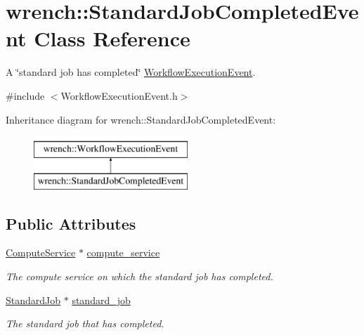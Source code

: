 \hypertarget{classwrench_1_1_standard_job_completed_event}{}\section{wrench\+:\+:Standard\+Job\+Completed\+Event Class Reference}
\label{classwrench_1_1_standard_job_completed_event}


A \char`\"{}standard job has completed\char`\"{} \hyperlink{classwrench_1_1_workflow_execution_event}{Workflow\+Execution\+Event}.  




{\ttfamily \#include $<$Workflow\+Execution\+Event.\+h$>$}

Inheritance diagram for wrench\+:\+:Standard\+Job\+Completed\+Event\+:\begin{figure}[H]
\begin{center}
\leavevmode
\includegraphics[height=2.000000cm]{classwrench_1_1_standard_job_completed_event}
\end{center}
\end{figure}
\subsection*{Public Attributes}
\begin{DoxyCompactItemize}
\item 
\mbox{\label{classwrench_1_1_standard_job_completed_event_a669562afa93fcd8b241b000617fdfcf0}} 
\hyperlink{classwrench_1_1_compute_service}{Compute\+Service} $\ast$ \hyperlink{classwrench_1_1_standard_job_completed_event_a669562afa93fcd8b241b000617fdfcf0}{compute\+\_\+service}
\begin{DoxyCompactList}\small\item\em The compute service on which the standard job has completed. \end{DoxyCompactList}\item 
\mbox{\label{classwrench_1_1_standard_job_completed_event_a75e91df3648ecf00c29fcc5d9682808c}} 
\hyperlink{classwrench_1_1_standard_job}{Standard\+Job} $\ast$ \hyperlink{classwrench_1_1_standard_job_completed_event_a75e91df3648ecf00c29fcc5d9682808c}{standard\+\_\+job}
\begin{DoxyCompactList}\small\item\em The standard job that has completed. \end{DoxyCompactList}\end{DoxyCompactItemize}
